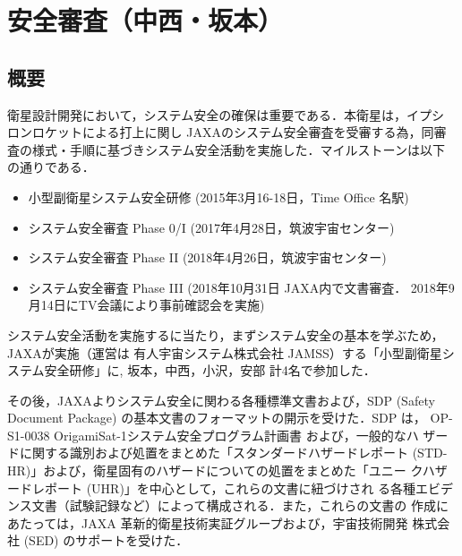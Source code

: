 \chapter{安全審査（中西・坂本）}
\label{chap:safety}

%

\section{概要}

衛星設計開発において，システム安全の確保は重要である．本衛星は，イプシ
ロンロケットによる打上に関し JAXAのシステム安全審査を受審する為，同審
査の様式・手順に基づきシステム安全活動を実施した．マイルストーンは以下
の通りである．

\begin{itemize}
  \item 小型副衛星システム安全研修 (2015年3月16-18日，Time Office
    名駅)
  \item システム安全審査 Phase 0/I (2017年4月28日，筑波宇宙センター)
  \item システム安全審査 Phase II (2018年4月26日，筑波宇宙センター)
  \item システム安全審査 Phase III (2018年10月31日 JAXA内で文書審査．
    2018年9月14日にTV会議により事前確認会を実施)
\end{itemize}


システム安全活動を実施するに当たり，まずシステム安全の基本を学ぶため，
JAXAが実施（運営は 有人宇宙システム株式会社 JAMSS）する「小型副衛星システム安全研修」に,
坂本，中西，小沢，安部 計4名で参加した．

その後，JAXAよりシステム安全に関わる各種標準文書および，SDP (Safety
Document Package) の基本文書のフォーマットの開示を受けた．SDP は，
OP-S1-0038 OrigamiSat-1システム安全プログラム計画書 および，一般的なハ
ザードに関する識別および処置をまとめた「スタンダードハザードレポート
  (STD-HR)」および，衛星固有のハザードについての処置をまとめた「ユニー
  クハザードレポート (UHR)」を中心として，これらの文書に紐づけされ
る各種エビデンス文書（試験記録など）によって構成される．また，これらの文書の
作成にあたっては，JAXA 革新的衛星技術実証グループおよび，宇宙技術開発
株式会社 (SED) のサポートを受けた．




